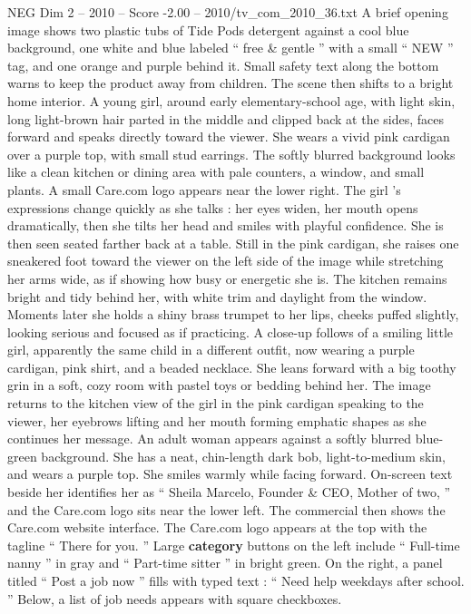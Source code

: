 \begin{textsample}{NEG Dim 2 – 2010 – Score -2.00 – 2010/tv\_com\_2010\_36.txt}  \label{ex:f2_neg_042}
A brief opening image shows two plastic tubs of Tide Pods detergent against a cool blue background, one white and blue labeled “ free \& gentle ” with a small “ NEW ” tag, and one orange and purple behind it.
Small safety text along the bottom warns to keep the product away from children.
The scene then shifts to a bright home interior.
A young girl, around early elementary-school age, with light skin, long light-brown hair parted in the middle and clipped back at the sides, faces forward and speaks directly toward the viewer.
She wears a vivid pink cardigan over a purple top, with small stud earrings.
The softly blurred background looks like a clean kitchen or dining area with pale counters, a window, and small plants.
A small Care.com logo appears near the lower right.
The girl ’s expressions change quickly as she talks : her eyes widen, her mouth opens dramatically, then she tilts her head and smiles with playful confidence.
She is then seen seated farther back at a table.
Still in the pink cardigan, she raises one sneakered foot toward the viewer on the left side of the image while stretching her arms wide, as if showing how busy or energetic she is.
The kitchen remains bright and tidy behind her, with white trim and daylight from the window.
Moments later she holds a shiny brass trumpet to her lips, cheeks puffed slightly, looking serious and focused as if practicing.
A close-up follows of a smiling little girl, apparently the same child in a different outfit, now wearing a purple cardigan, pink shirt, and a beaded necklace.
She leans forward with a big toothy grin in a soft, cozy room with pastel toys or bedding behind her.
The image returns to the kitchen view of the girl in the pink cardigan speaking to the viewer, her eyebrows lifting and her mouth forming emphatic shapes as she continues her message.
An adult woman appears against a softly blurred blue-green background.
She has a neat, chin-length dark bob, light-to-medium skin, and wears a purple top.
She smiles warmly while facing forward.
On-screen text beside her identifies her as “ Sheila Marcelo, Founder \& CEO, Mother of two, ” and the Care.com logo sits near the lower left.
The commercial then shows the Care.com website interface.
The Care.com logo appears at the top with the tagline “ There for you. ” Large \textbf{category} buttons on the left include “ Full-time nanny ” in gray and “ Part-time sitter ” in bright green.
On the right, a panel titled “ Post a job now ” fills with typed text : “ Need help weekdays after school. ” Below, a list of job needs appears with square checkboxes.

\end{textsample}
